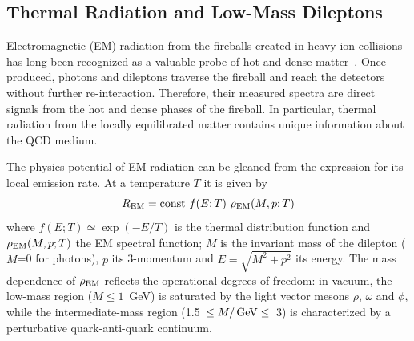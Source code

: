 \subsection{Thermal Radiation and Low-Mass Dileptons}
        \label{Sec:EM}

Electromagnetic (EM) radiation from the fireballs created in heavy-ion collisions
has long been recognized as a valuable probe of hot and dense
matter~\cite{Feinberg:1976ua,Shuryak:1978ij}. Once produced, photons and dileptons
traverse the fireball and reach the detectors without further
re-interaction. Therefore, their measured spectra are direct signals from the hot and dense
phases of the fireball. In particular, thermal radiation from the locally equilibrated
matter contains unique information about the QCD medium.

The physics potential of EM radiation can be gleaned from the expression for its
local emission rate. At a temperature $T$ it is given by
\begin{equation}
R_{\rm EM} = {\rm const} \ f(E;T) \ \rho_{\rm EM}(M,p;T)
\label{eq:rate}
\end{equation}
where $f(E;T)\simeq \exp(-E/T)$ is the thermal distribution function and
$\rho_{\rm EM}(M,p;T)$ the EM spectral function; $M$ is the invariant mass of the
dilepton ($M$=0 for photons), $p$ its 3-momentum and $E=\sqrt{M^2+p^2}$ its energy.
The mass dependence of $\rho_{\rm EM}$ reflects the operational degrees of freedom:
in vacuum, the low-mass region ($M\le 1$~GeV) is saturated by the light vector mesons
$\rho$, $\omega$ and $\phi$, while the intermediate-mass region (1.5~$\le M/\,\mathrm{GeV} \le$~3)
is characterized by a perturbative quark-anti-quark continuum.

